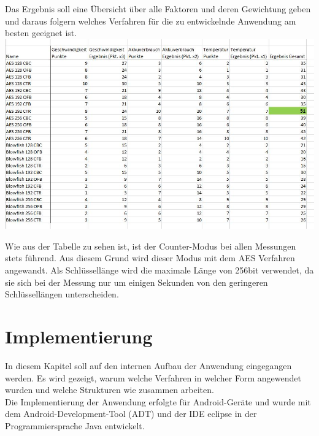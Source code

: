 \documentclass[10pt, a4paper,headsepline]{scrreprt}
\begin{document}
Das Ergebnis soll eine Übersicht über alle Faktoren und deren Gewichtung geben und daraus folgern welches Verfahren für die zu entwickelnde Anwendung am besten geeignet ist.  \\

\includegraphics[scale=0.65]{tabelle_Cryptovergleich_einzeln.JPG}
\hfill

Wie aus der Tabelle zu sehen ist, ist der Counter-Modus bei allen Messungen stets führend. Aus diesem Grund wird dieser Modus mit dem AES Verfahren angewandt. Als Schlüssellänge wird die maximale Länge von 256bit verwendet, da sie sich bei der Messung nur um einigen Sekunden von den geringeren Schlüssellängen unterscheiden.

\chapter{Implementierung}
In diesem Kapitel soll auf den internen Aufbau der Anwendung eingegangen werden. Es wird gezeigt, warum welche Verfahren in welcher Form angewendet wurden und welche Strukturen wie zusammen arbeiten. \\
Die Implementierung der Anwendung erfolgte für Android-Geräte und wurde mit dem Android-Development-Tool (ADT) und der IDE eclipse in der Programmiersprache Java entwickelt.  
\end{document}
